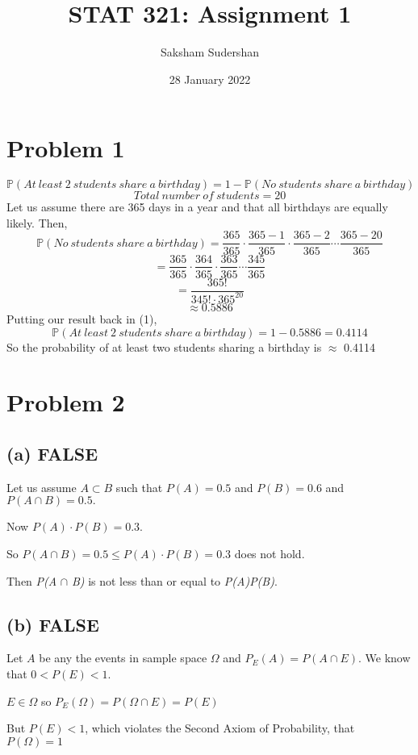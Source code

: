 \documentclass{article}
\title{ STAT 321: Assignment 1}
\author{Saksham Sudershan}
\date{28 January 2022}
\begin{document}
	\maketitle

	\section*{Problem 1}
		\begin{equation}
			\mathbb{P}(At\ least\ 2\ students\ share\ a\ birthday) = 1 - \mathbb{P}(No\ students\ share\ a\ birthday)
		\end{equation}
		$$ Total\ number\ of\ students = 20 $$
		Let us assume there are 365 days in a year and that all birthdays are equally likely. Then,
		$$ \mathbb{P}(No\ students\ share\ a\ birthday)= \frac{365}{365} \cdot \frac{365-1}{365} \cdot \frac{365-2}{365} \cdots \frac{365-20}{365} $$
		$$ = \frac{365}{365} \cdot \frac{364}{365} \cdot \frac{363}{365}\cdots \frac{345}{365} $$
		$$ = \frac{365!}{345! \cdot 365^{20}} $$
		$$ \approx 0.5886 $$
		Putting our result back in (1),
		 $$ \mathbb{P}(At\ least\ 2\ students\ share\ a\ birthday) = 1 - 0.5886 = 0.4114 $$
		So the probability of at least two students sharing a birthday is $\approx$ 0.4114
		
	\section*{Problem 2}
		\subsection*{(a) FALSE}
			Let us assume $A\subset B$ such that $ P(A) = 0.5$ and $P(B) = 0.6$ and $P(A\cap B) = 0.5.$ 
			
			Now $P(A)\cdot P(B) = 0.3. $

			So $P(A\cap B)=0.5 \leq P(A)\cdot P(B)=0.3$ does not hold.
			
			Then \emph{P(A} $\cap$ \emph{B)} is not less than or equal to \emph{P(A)P(B)}.
		
		\subsection*{(b) FALSE}
			Let $ A$ be any the events in sample space $\Omega$ and $ P_{E}(A)=P(A \cap E)$. We know that $0<P(E)<1$.
			
			$ E \in \Omega$ so $ P_{E}(\Omega)=P(\Omega \cap E)=P(E)$
		
			But $P(E)<1$, which violates the Second Axiom of Probability, that $P(\Omega)=1$
\end{document}
